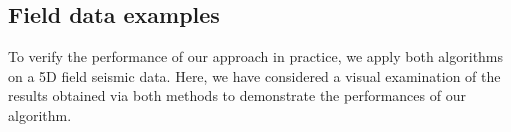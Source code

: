 \subsection{Field data examples}
To verify the performance of our approach in practice, we apply both algorithms on a 5D field seismic data. Here, we have considered a visual examination of the results obtained via both methods to demonstrate the performances of our algorithm.

